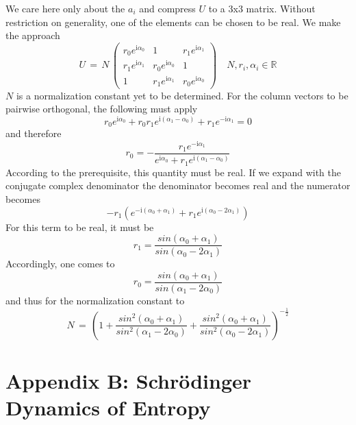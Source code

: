 \documentclass[12pt]{article}
\begin{document}
We care here only about the $a_i$ and compress $U$ to a 3x3 matrix. Without restriction on generality, one of the elements can be chosen to be real. We make the approach
\begin{equation*}
U\, =\, N \, 
\begin{pmatrix}
r_0 e^{\mathrm i\alpha_0} & 1 & r_1 e^{\mathrm i\alpha_1} \\
r_1 e^{\mathrm i\alpha_1} & r_0 e^{\mathrm i\alpha_0} & 1 \\
1 & r_1 e^{\mathrm i\alpha_1} & r_0 e^{\mathrm i\alpha_0}
\end{pmatrix}
\quad N, r_i, \alpha_i \in \mathbb{R}
\end{equation*}
$N$ is a normalization constant yet to be determined. For the column vectors to be pairwise orthogonal, the following must apply
\begin{equation*}
r_0 e^{\mathrm  i\alpha_0} + r_0 r_1 e^{\mathrm i(\alpha_1 - \alpha_0)} + r_1 e^{- \mathrm  i\alpha_1} = 0
\end{equation*}
and therefore 
\begin{equation*}
r_0 = - \frac{r_1 e^{-\mathrm i\alpha_1}}{ e^{\mathrm i\alpha_0} + r_1 e^{\mathrm i(\alpha_1 - \alpha_0)} }
\end{equation*}
According to the prerequisite, this quantity must be real. If we expand with the conjugate complex denominator the denominator becomes real and the numerator becomes
\begin{equation*}
-r_1 \left( e^{-\mathrm i(\alpha_0+\alpha_1)} + r_1 e^{\mathrm i(\alpha_0-2\alpha_1)} \right)
\end{equation*}
For this term to be real, it must be
\begin{equation*}
r_1=\frac{sin(\alpha_0+\alpha_1)}{sin(\alpha_0-2\alpha_1)}
\end{equation*}
Accordingly, one comes to 
\begin{equation*}
r_0=\frac{sin(\alpha_0+\alpha_1)}{sin(\alpha_1-2\alpha_0)}
\end{equation*}
and thus for the normalization constant to 
\begin{equation*}
N\, = \, \left( 1 +
\frac{sin^2(\alpha_0+\alpha_1)}{sin^2(\alpha_1-2\alpha_0)} +
\frac{sin^2(\alpha_0+\alpha_1)}{sin^2(\alpha_0-2\alpha_1)} \right)^{-\frac{1}{2}}
\end{equation*}

\section{Appendix B: Schrödinger Dynamics of Entropy}
\end{document}

